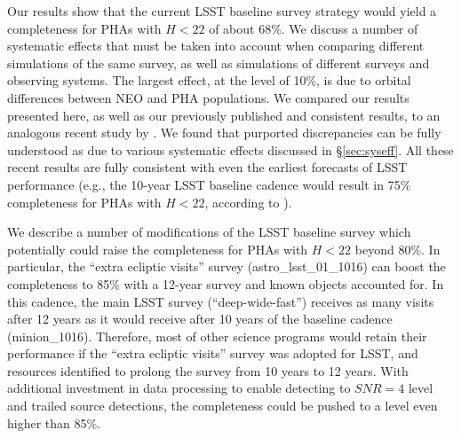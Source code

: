 Our results show that the current LSST baseline survey strategy would yield a completeness for PHAs
with $H<22$ of about 68\%. We discuss a number of systematic effects that must be taken into
account when comparing different simulations of the same survey, as well as simulations of different
surveys and observing systems. The largest effect, at the level of 10\%, is due to orbital differences
between NEO and PHA populations. We compared our results presented here, as well as our previously
published and consistent results, to an analogous recent study by \citet[]{GMS2016}. We found that
purported discrepancies can be fully understood as due to various systematic effects discussed in
\S\ref{sec:syseff}. All these recent results are fully consistent with even the earliest forecasts of LSST
performance (e.g., the 10-year LSST baseline cadence would result in 75\% completeness for PHAs
with $H<22$, according to \citealt{IvezicNEO2007}).

We describe a number of modifications of the LSST baseline survey which potentially could raise the
completeness for PHAs with $H<22$ beyond 80\%. In particular, the ``extra ecliptic visits'' survey
(astro\_lsst\_01\_1016) can boost the completeness to 85\% with a 12-year survey and known objects
accounted for. In this cadence, the main LSST survey (``deep-wide-fast'')
receives as many visits after 12 years as it would receive after 10 years of the
baseline cadence (minion\_1016). Therefore, most of other science programs would
retain their performance if the ``extra ecliptic visits'' survey was adopted for
LSST, and resources identified to prolong the survey from 10 years to 12 years. With additional 
investment in data processing to enable detecting to $SNR=4$ level and trailed source detections, 
the completeness could be pushed to a level even higher than 85\%. 
